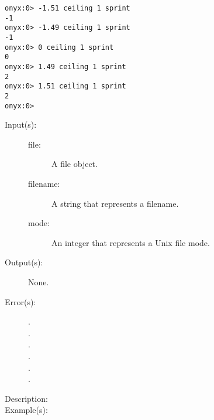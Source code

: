 \begin{description}
\begin{description}
\begin{verbatim}
onyx:0> -1.51 ceiling 1 sprint
-1
onyx:0> -1.49 ceiling 1 sprint
-1
onyx:0> 0 ceiling 1 sprint
0
onyx:0> 1.49 ceiling 1 sprint
2
onyx:0> 1.51 ceiling 1 sprint
2
onyx:0>
		\end{verbatim}
	\end{description}
\label{systemdict:chmod}
\item[{\onyxop{file/filename mode}{chmod}{--}}: ]
	\begin{description}\item[]
	\item[Input(s): ]
		\begin{description}\item[]
		\item[file: ]
			A file object.
		\item[filename: ]
			A string that represents a filename.
		\item[mode: ]
			An integer that represents a Unix file mode.
		\end{description}
	\item[Output(s): ] None.
	\item[Error(s): ]
		\begin{description}\item[]
		\item[.]
		\item[.]
		\item[.]
		\item[.]
		\item[.]
		\item[.]
		\end{description}
	\item[Description: ]
	\item[Example(s): ]\begin{verbatim}


\end{verbatim}
\end{description}
\end{description}
